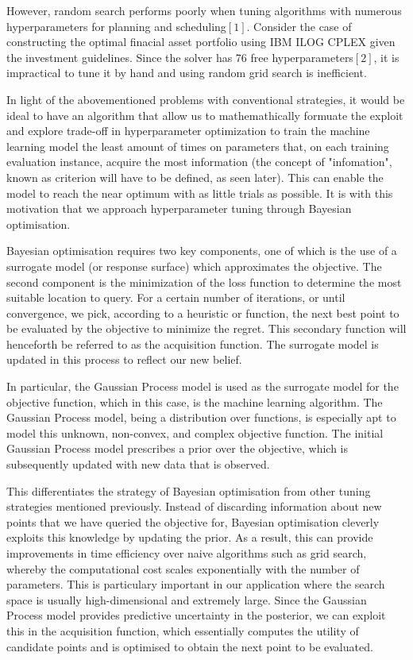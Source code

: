 \documentclass[letterpaper]{article}
\begin{document}
However, random search performs poorly when tuning algorithms with numerous hyperparameters for planning and scheduling$[1]$. Consider the case of constructing the optimal finacial asset portfolio using IBM ILOG CPLEX given the investment guidelines. Since the solver has 76 free hyperparameters$[2]$, it is impractical to tune it by hand and using random grid search is inefficient.

In light of the abovementioned problems with conventional strategies, it would be ideal
to have an algorithm that allow us to mathemathically formuate the exploit and explore
trade-off in hyperparameter optimization to train the machine learning model the least
amount of times on parameters that, on each training evaluation instance, acquire the
most information (the concept of "infomation", known as criterion will have to be defined,
as seen later). This can enable the model to reach the near optimum with as little trials as possible.
It is with this motivation that we approach hyperparameter tuning through Bayesian optimisation.

Bayesian optimisation requires two key components, one of which is the use of a surrogate model (or response surface)
which approximates the objective. The second component is the minimization of the loss function to determine the most suitable location to query.
For a certain number of iterations, or until convergence, we pick, according to a heuristic or function,
the next best point to be evaluated by the objective to minimize the regret.
This secondary function will henceforth be referred to as the acquisition function. The
surrogate model is updated in this process to reflect our new belief. 

In particular, the Gaussian Process model is used as the surrogate model
for the objective function, which in this case, is the machine learning algorithm.
The Gaussian Process model, being a distribution over functions, is especially apt
to model this unknown, non-convex, and complex objective function. The
initial Gaussian Process model prescribes a prior over the objective, which is
subsequently updated with new data that is observed.

This differentiates the strategy of Bayesian optimisation from other tuning
strategies mentioned previously. Instead of discarding information about new points
that we have queried the objective for, Bayesian optimisation cleverly exploits this
knowledge by updating the prior. As a result, this can provide improvements in time
efficiency over naive algorithms such as grid search, whereby the computational
cost scales exponentially with the number of parameters.  This is particulary
important in our application where the search space is usually high-dimensional
and extremely large. Since the Gaussian Process model provides predictive uncertainty
in the posterior, we can exploit this in the acquisition function, which essentially
computes the utility of candidate points and is optimised to obtain the next point
to be evaluated.
\end{document}
